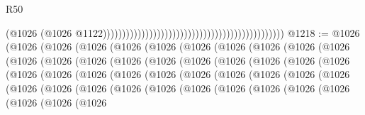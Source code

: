 \begin{lexlean}{R50}
\begin{coremodule}
{{{{{{{{{{{{{{{{{{{{{{{{{{{{{{{{{{{{{{{{{{{{{{{{{{{{{{{{{{{{                                                                                              (@1026
                                                                                                (@1026
                                                                                                  @1122)))))))))))))))))))))))))))))))))))))))))))))))
@1218 := @1026
    (@1026
      (@1026
        (@1026
          (@1026
            (@1026
              (@1026
                (@1026
                  (@1026
                    (@1026
                      (@1026
                        (@1026
                          (@1026
                            (@1026
                              (@1026
                                (@1026
                                  (@1026
                                    (@1026
                                      (@1026
                                        (@1026
                                          (@1026
                                            (@1026
                                              (@1026
                                                (@1026
                                                  (@1026
                                                    (@1026
                                                      (@1026
                                                        (@1026
                                                          (@1026
                                                            (@1026
                                                              (@1026
                                                                (@1026
                                                                  (@1026
                                                                    (@1026
                                                                      (@1026
                                                                        (@1026
                                                                          (@1026
                                                                            (@1026
                                                                              (@1026
                                                                                (@1026
                                                                                  (@1026
                                                                                    (@1026
                                                                                      (@1026
                                                                                        (@1026
}}}}}}}}}}}}}}}}}}}}}}}}}}}}}}}}}}}}}}}}}}}}}}}}}}}}}}}}}}}}
\end{coremodule}
\end{lexlean}
